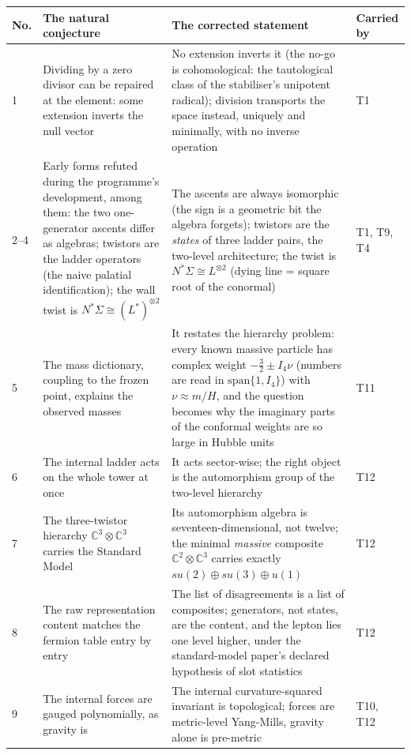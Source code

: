 \documentclass[11pt]{article}
\theoremstyle{definition}
\theoremstyle{plain}
\providecommand{\C}{}\renewcommand{\C}{\mathbb{C}}
\begin{document}
  \begin{longtable}{p{} p{} p{} p{}}
\toprule
\textbf{No.} & \textbf{The natural conjecture} & \textbf{The corrected statement} & \textbf{Carried by} \\
\midrule
\endhead
1 & Dividing by a zero divisor can be repaired at the element: some extension inverts the null vector & No extension inverts it (the no-go is cohomological: the tautological class of the stabiliser's unipotent radical); division transports the space instead, uniquely and minimally, with no inverse operation & T1 \\
2--4 & Early forms refuted during the programme's development, among them: the two one-generator ascents differ as algebras; twistors are the ladder operators (the naive palatial identification); the wall twist is $N^{*}\Sigma \cong (L^{*})^{\otimes 2}$ & The ascents are always isomorphic (the sign is a geometric bit the algebra forgets); twistors are the \emph{states} of three ladder pairs, the two-level architecture; the twist is $N^{*}\Sigma \cong L^{\otimes 2}$ (dying line = square root of the conormal) & T1, T9, T4 \\
5 & The mass dictionary, coupling to the frozen point, explains the observed masses & It restates the hierarchy problem: every known massive particle has complex weight $-\tfrac32 \pm I_4\nu$ (numbers are read in $\mathrm{span}\{1, I_4\}$) with $\nu \approx m/H$, and the question becomes why the imaginary parts of the conformal weights are so large in Hubble units & T11 \\
6 & The internal ladder acts on the whole tower at once & It acts sector-wise; the right object is the automorphism group of the two-level hierarchy & T12 \\
7 & The three-twistor hierarchy $\C^{3}\otimes\C^{3}$ carries the Standard Model & Its automorphism algebra is seventeen-dimensional, not twelve; the minimal \emph{massive} composite $\C^{2}\otimes\C^{3}$ carries exactly $su(2)\oplus su(3)\oplus u(1)$ & T12 \\
8 & The raw representation content matches the fermion table entry by entry & The list of disagreements is a list of composites; generators, not states, are the content, and the lepton lies one level higher, under the standard-model paper's declared hypothesis of slot statistics & T12 \\
9 & The internal forces are gauged polynomially, as gravity is & The internal curvature-squared invariant is topological; forces are metric-level Yang-Mills, gravity alone is pre-metric & T10, T12 \\

\end{longtable}
\end{document}
